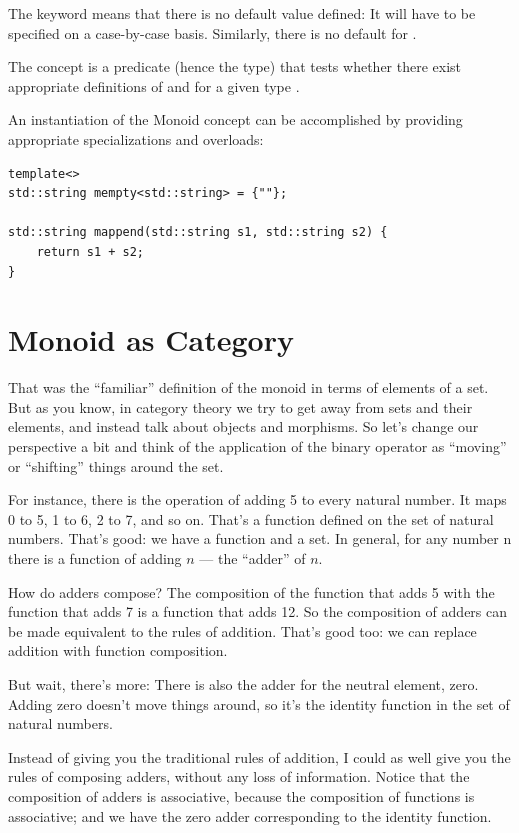 The keyword  means that there is no default value
defined: It will have to be specified on a case-by-case basis.
Similarly, there is no default for .

The concept  is a predicate (hence the 
type) that tests whether there exist appropriate definitions of
 and  for a given type .

An instantiation of the Monoid concept can be accomplished by providing
appropriate specializations and overloads:

\begin{Verbatim}
template<>
std::string mempty<std::string> = {""};

std::string mappend(std::string s1, std::string s2) { 
    return s1 + s2;
}
\end{Verbatim}

\section{Monoid as Category}

That was the ``familiar'' definition of the monoid in terms of elements
of a set. But as you know, in category theory we try to get away from
sets and their elements, and instead talk about objects and morphisms.
So let's change our perspective a bit and think of the application of
the binary operator as ``moving'' or ``shifting'' things around the set.

For instance, there is the operation of adding 5 to every natural
number. It maps 0 to 5, 1 to 6, 2 to 7, and so on. That's a function
defined on the set of natural numbers. That's good: we have a function
and a set. In general, for any number n there is a function of adding $n$
--- the ``adder'' of $n$.

How do adders compose? The composition of the function that adds 5 with
the function that adds 7 is a function that adds 12. So the composition
of adders can be made equivalent to the rules of addition. That's good
too: we can replace addition with function composition.

But wait, there's more: There is also the adder for the neutral element,
zero. Adding zero doesn't move things around, so it's the identity
function in the set of natural numbers.

Instead of giving you the traditional rules of addition, I could as well
give you the rules of composing adders, without any loss of information.
Notice that the composition of adders is associative, because the
composition of functions is associative; and we have the zero adder
corresponding to the identity function.

